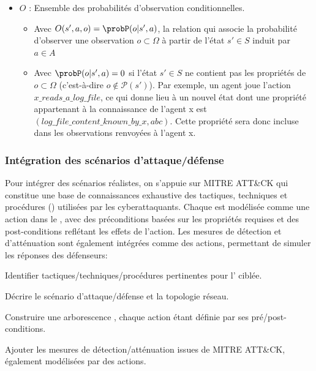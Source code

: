 \begin{itemize}
    \item $O$ : Ensemble des probabilités d'observation conditionnelles.
          \begin{itemize}
              \item Avec $O(s',a,o) = \probP(o|s',a)$, la relation qui associe la probabilité d'observer une observation $o \subset \Omega$ à partir de l'état $s' \in S$ induit par $a \in A$
              \item Avec $\probP(o|s',a) = 0$ si l'état $s' \in S$ ne contient pas les propriétés de $o \subset \Omega$ (c'est-à-dire $o \not\in \mathcal{P}(s')$). Par exemple, un agent joue l'action $x\_reads\_a\_log\_file$, ce qui donne lieu à un nouvel état dont une propriété appartenant à la connaissance de l'agent x est $(log\_file\_content\_known\_by\_x, \allowbreak abc)$. Cette propriété sera donc incluse dans les observations renvoyées à l'agent x.
          \end{itemize}

\end{itemize}


\subsubsection{Intégration des scénarios d’attaque/défense}

Pour intégrer des scénarios réalistes, on s’appuie sur MITRE ATT\&CK qui constitue une base de connaissances exhaustive des tactiques, techniques et procédures () utilisées par les cyberattaquants.
Chaque  est modélisée comme une action dans le , avec des préconditions basées sur les propriétés requises et des post-conditions reflétant les effets de l’action.
Les mesures de détection et d’atténuation sont également intégrées comme des actions, permettant de simuler les réponses des défenseurs:
\begin{enumerate*}[label=\arabic*),itemjoin={;\quad}]
    \item Identifier tactiques/techniques/procédures pertinentes pour l’ ciblée.
    \item Décrire le scénario d’attaque/défense et la topologie réseau.
    \item Construire une arborescence , chaque action étant définie par ses pré/post-conditions.
    \item Ajouter les mesures de détection/atténuation issues de MITRE ATT\&CK, également modélisées par des actions.
\end{enumerate*}

